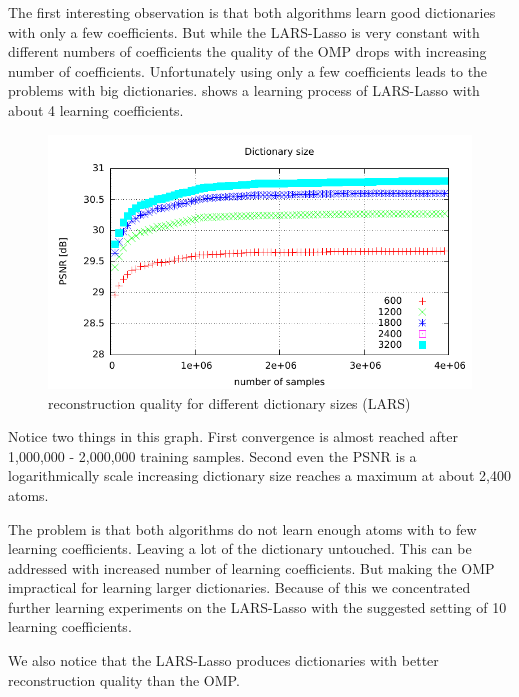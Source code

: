 
The first interesting observation is that both algorithms learn good
dictionaries with only a few coefficients. But while the LARS-Lasso is very
constant with different numbers of coefficients the quality of the OMP drops
with increasing number of coefficients. 
Unfortunately using only a few coefficients leads to the problems with big
dictionaries.  shows a learning process of
LARS-Lasso with about 4 learning coefficients.
\begin{figure}[H]
\centering
\includegraphics[width = 1.0\textwidth]{../tests/results/dictSizeLasso.pdf}
\caption{reconstruction quality for different dictionary sizes (LARS)}
\label{fig:dictSizeLassoBad}
\end{figure}
Notice two things in this graph. First convergence is almost reached
after 1,000,000 - 2,000,000 training samples. Second even the PSNR is a
logarithmically scale increasing dictionary size reaches a maximum at
about 2,400 atoms. 

The problem is that both algorithms do not learn enough atoms with to few
learning coefficients. Leaving a lot of the dictionary untouched. This can be
addressed with increased number of learning coefficients. But making the OMP
impractical for learning larger dictionaries.
Because of this we concentrated further learning experiments on the LARS-Lasso
with the suggested setting of 10 learning coefficients. 

We also notice that the LARS-Lasso produces dictionaries with better
reconstruction quality than the OMP.

